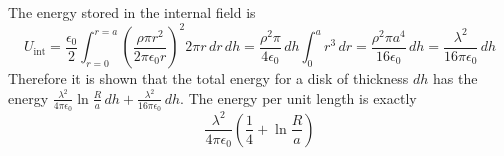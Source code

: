 \documentclass{article}
\begin{document}
\begin{homeworkProblem}
{		The energy stored in the internal field is
		\[
			U_\mathrm{int}=\frac{\epsilon_0}{2}\int_{r=0}^{r=a}\left(\frac{\rho\pi r^2}{2\pi\epsilon_0r}\right)^2 2\pi r\,dr\,dh=\frac{\rho^2\pi}{4\epsilon_0}\,dh\int_0^a r^3\,dr=\frac{\rho^2\pi a^4}{16\epsilon_0}\,dh=\frac{\lambda^2}{16\pi\epsilon_0}\,dh
		\]
		Therefore it is shown that the total energy for a disk of thickness $dh$ has the energy $\frac{\lambda^2}{4\pi\epsilon_0}\ln\frac{R}{a}\,dh+\frac{\lambda^2}{16\pi\epsilon_0}\,dh$. The energy per unit length is exactly
		\[
			\frac{\lambda^2}{4\pi\epsilon_0}\left(\frac{1}{4}+\ln\frac{R}{a}\right)
		\]
	}
\end{homeworkProblem}

\end{document}
